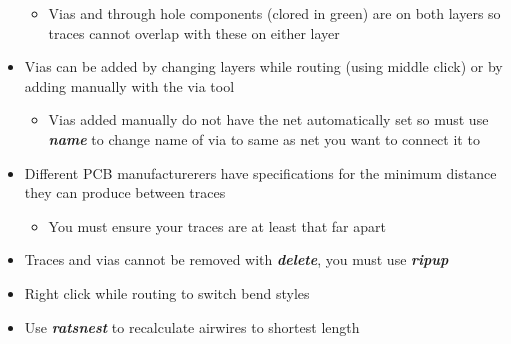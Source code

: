 \documentclass{article}
\begin{document}
\begin{itemize}
\begin{itemize}
        \item Vias and through hole components (clored in green) are on both
        layers so traces cannot overlap with these on either layer
    \end{itemize}
    \item Vias can be added by changing layers while routing (using middle
    click) or by adding manually with the via tool
    \begin{itemize}
        \item Vias added manually do not have the net automatically set so must
        use \textit{\textbf{name}} to change name of via to same as net you
        want to connect it to
    \end{itemize}
    \item Different PCB manufacturerers have specifications for the minimum
    distance they can produce between traces
    \begin{itemize}
        \item You must ensure your traces are at least that far apart
    \end{itemize}
    \item Traces and vias cannot be removed with \textit{\textbf{delete}}, you
    must use \textit{\textbf{ripup}}
\end{itemize}
\begin{tcolorbox} [title=Tips \& Tricks]
    \begin{itemize}
        \item Right click while routing to switch bend styles
        \item Use \textit{\textbf{ratsnest}} to recalculate airwires to shortest
        length
    \end{itemize}
\end{tcolorbox}
\end{document}
